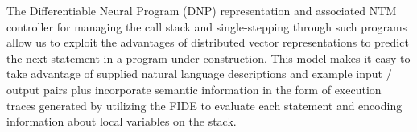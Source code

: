 
The Differentiable Neural Program (DNP) representation and associated NTM controller for managing the call stack and single-stepping through such programs allow us to exploit the advantages of distributed vector representations to predict the next statement in a program under construction. This model makes it easy to take advantage of supplied natural language descriptions and example input / output pairs plus incorporate semantic information in the form of execution traces generated by utilizing the FIDE to evaluate each statement and encoding information about local variables on the stack. 

